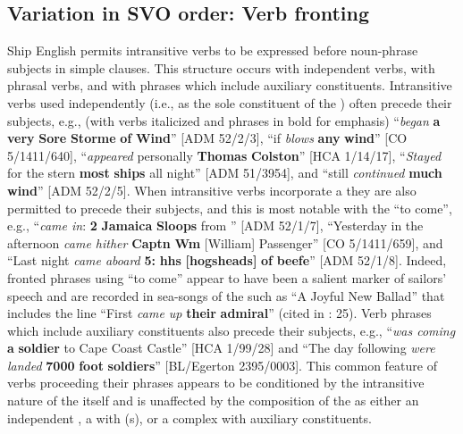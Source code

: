 \subsection{{Variation in SVO order: Verb fronting}}%

Ship English permits intransitive verbs to be expressed before noun-phrase subjects in simple clauses. This structure occurs with independent verbs, with phrasal verbs, and with  phrases which include auxiliary constituents. Intransitive verbs used independently (i.e., as the sole constituent of the ) often precede their  subjects, e.g., (with verbs italicized and  phrases in bold for emphasis) “\textit{began} \textbf{a} \textbf{very} \textbf{Sore} \textbf{Storme} \textbf{of} \textbf{Wind}” [ADM 52/2/3], “if \textit{blows} \textbf{any} \textbf{wind}” [CO 5/1411/640], “\textit{appeared} personally \textbf{Thomas} \textbf{Colston}” [HCA 1/14/17], “\textit{Stayed} for the stern \textbf{most} \textbf{ships} all night” [ADM 51/3954], and “still \textit{continued} \textbf{much} \textbf{wind}” [ADM 52/2/5]. When intransitive verbs incorporate a  they are also permitted to precede their  subjects, and this is most notable with the  “to come”, e.g., “\textit{came in}: \textbf{2} \textbf{Jamaica} \textbf{Sloops} from ” [ADM 52/1/7], “Yesterday in the afternoon \textit{came hither} \textbf{Captn} \textbf{Wm} [William] Passenger” [CO 5/1411/659], and “Last night \textit{came aboard} \textbf{5:} \textbf{hhs} \textbf{[hogsheads]} \textbf{of} \textbf{beefe}” [ADM 52/1/8]. Indeed, fronted  phrases using “to come” appear to have been a salient marker of sailors’ speech and are recorded in sea-songs of the  such as “A Joyful New Ballad” that includes the line “First \textit{came up} \textbf{their} \textbf{admiral}” (cited in \citealt{Palmer1986}: 25). Verb phrases which include auxiliary constituents also precede their  subjects, e.g., “\textit{was coming} \textbf{a} \textbf{soldier} to Cape Coast Castle” [HCA 1/99/28] and “The day following \textit{were landed} \textbf{7000} \textbf{foot} \textbf{soldiers}” [BL/Egerton 2395/0003]. This common feature of verbs proceeding their  phrases appears to be conditioned by the intransitive nature of the  itself and is unaffected by the composition of the  as either an independent , a  with (s), or a complex  with auxiliary constituents. 

